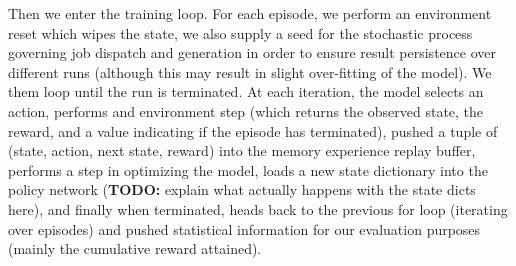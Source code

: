 \documentclass{article}
\begin{document}
\begin{spacing}{2.0}
Then we enter the training loop. For each episode, we perform an environment reset which wipes the state, we also supply a seed for the stochastic process
governing job dispatch and generation in order to ensure result persistence over different runs (although this may result in slight over-fitting of the model).
We them loop until the run is terminated. At each iteration, the model selects an action, performs and environment step (which returns the observed state, the
reward, and a value indicating if the episode has terminated), pushed a tuple of (state, action, next state, reward) into the memory experience replay buffer,
performs a step in optimizing the model, loads a new state dictionary into the policy network (\textbf{TODO:} explain what actually happens with the state dicts here),
and finally when terminated, heads back to the previous for loop (iterating over episodes) and pushed statistical information for our evaluation purposes (mainly
the cumulative reward attained).

\end{spacing}
\end{document}
